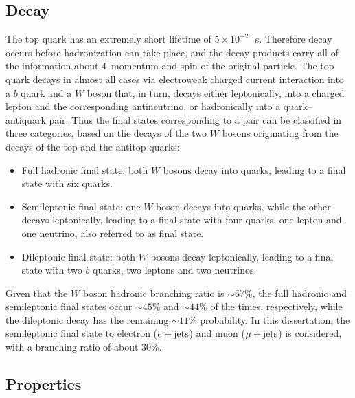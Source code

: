 \subsection{Decay}
\label{sec:topdecay}

The top quark has an extremely short lifetime of $5\times{}10^{-25}$
s. Therefore decay occurs before hadronization can take place, and the
decay products carry all of the information about \mbox{4--momentum} and spin
of the original particle.
The top quark decays in almost all cases via electroweak
charged current interaction into a $b$ quark and a $W$ boson that,
in turn, decays either leptonically, into a charged lepton and the corresponding
antineutrino, or hadronically into a quark--antiquark pair. Thus the
final states corresponding to a \ttbar{} pair can be classified in
three categories, based on the decays of the two $W$ bosons
originating from the decays of the top and the antitop quarks:
\begin{itemize}
\item Full hadronic final state: both $W$ bosons decay into quarks,
  leading to a \ttbar{} final state with six quarks.
\item Semileptonic final state: one $W$ boson decays into quarks,
  while the other decays leptonically, leading to a final state with
  four quarks, one lepton and one neutrino, also referred to as
  \ljets{} final state.
\item Dileptonic final state: both $W$ bosons decay leptonically,
  leading to a final state with two $b$ quarks, two leptons and two
  neutrinos. 
\end{itemize}
Given that the $W$ boson hadronic branching ratio is
$\sim67\%$, the full hadronic and semileptonic final states occur
$\sim45\%$ and $\sim44\%$ of the times, respectively, while the
dileptonic decay has the remaining $\sim11\%$ probability. In this
dissertation, the semileptonic final state to electron ($e+{\rm jets}{}$)
and muon ($\mu+{\rm jets}$) is considered, with a branching ratio of about
30\%.

\subsection{Properties}
\label{sec:topprop}

